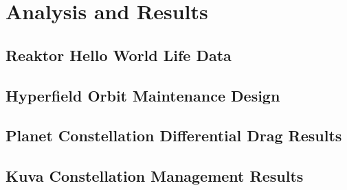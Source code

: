 \chapter{Analysis and Results} \label{results_chapter}

\section{Reaktor Hello World Life Data}

\section{Hyperfield Orbit Maintenance Design}

\section{Planet Constellation Differential Drag Results}

\section{Kuva Constellation Management Results}